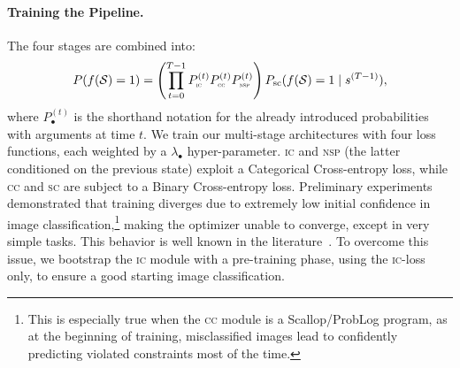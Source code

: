 \paragraph{Training the Pipeline.}
The four stages are combined into: 
\begin{equation}
	\nonumber
	P(f({\mathcal{S}}) = 1) = \left( \prod_{t=0}^{T-1} P^{(t)}_{\text{\sc\tiny ic}} P^{(t)}_{\text{\sc\tiny cc}} P^{(t)}_{\text{\sc\tiny nsp}} \right) P_{\text{sc}}(f({\mathcal{S}}) = 1 \mid s^{(T-1)}),
\end{equation}
where $P^{(t)}_{\bullet}$ is the shorthand notation for the already introduced probabilities with arguments at time $t$.
We train our multi-stage architectures with four loss functions, each weighted by a $\lambda_{\bullet}$ hyper-parameter. \textsc{ic} and \textsc{nsp} (the latter conditioned on the previous state) exploit a Categorical Cross-entropy loss, while \textsc{cc} and \textsc{sc} are subject to a Binary Cross-entropy loss.
Preliminary experiments demonstrated that training diverges due to extremely low initial confidence in image classification,\footnote{This is especially true when the \textsc{cc} module is a Scallop/ProbLog program, as at the beginning of training, misclassified images lead to confidently predicting violated constraints most of the time.} making the optimizer unable to converge, except in very simple tasks. This behavior is well known in the literature~\cite{manhaeve2021approximate,van2024independence,maene2024hardness}. 
To overcome this issue, we bootstrap the \textsc{ic} module with a pre-training phase, using the \textsc{ic}-loss only, to ensure a good starting image classification.

